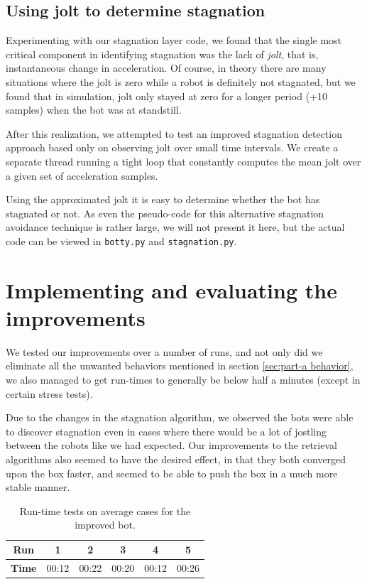 \documentclass[a4paper,10pt]{article}
\begin{document}
\subsection{Using jolt to determine stagnation}
Experimenting with our stagnation layer code, we found that the single most
critical component in identifying stagnation was the lack of \emph{jolt}, that
is, instantaneous change in acceleration. Of course, in theory there are many
situations where the jolt is zero while a robot is definitely not stagnated,
but we found that in simulation, jolt only stayed at zero for a longer period
(+10 samples) when the bot was at standstill.  

After this realization, we attempted to test an improved stagnation detection
approach based only on observing jolt over small time intervals. We create a
separate thread running a tight loop that constantly computes the mean
jolt over a given set of acceleration samples. 

Using the approximated jolt it is easy to determine whether the bot has
stagnated or not. As even the pseudo-code for this alternative stagnation
avoidance technique is
rather large, we will not present it here, but the actual code can be viewed
in \texttt{botty.py} and \texttt{stagnation.py}.


\section{Implementing and evaluating the improvements}
\label{sec:b2}
We tested our improvements over a number of runs, and not only did we eliminate
all the unwanted behaviors  mentioned in section \ref{sec:part-a behavior}, we also managed 
to get run-times to generally be below half a minutes (except in certain stress tests).

Due to the changes in the stagnation algorithm, we observed the bots were able 
to discover stagnation even in cases where there would be a lot of jostling
between the robots like we had expected. Our improvements to the retrieval
algorithms also seemed to have the desired effect, in that they both
converged upon the box faster, and seemed to be able to push the box
in a much more stable manner.

\begin{table}[h]
    \centering
    \begin{tabular}{c|c|c|c|c|c}
        \textbf{Run}    & \textbf{1} & \textbf{2} & \textbf{3} &
        \textbf{4}      & \textbf{5}     \\ \hline
        \textbf{Time}   & 00:12 & 00:22 & 00:20 & 00:12 & 00:26 \\
    \end{tabular}
    \caption{Run-time tests on average cases for the improved bot.}
    \label{improved bot tests}
\end{table}
\end{document}
